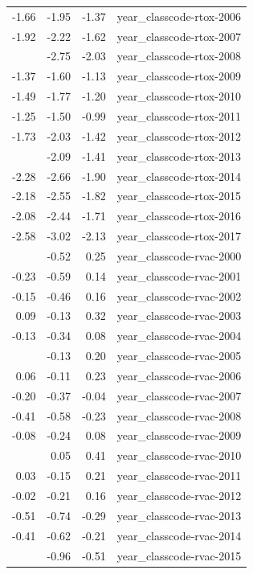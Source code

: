 \documentclass[]{article}
\begin{document}
\begin{longtable}[t]{rrrl}
-1.66 & -1.95 & -1.37 & year\_classcode-rtox-2006\\
-1.92 & -2.22 & -1.62 & year\_classcode-rtox-2007\\
\addlinespace
-2.39 & -2.75 & -2.03 & year\_classcode-rtox-2008\\
-1.37 & -1.60 & -1.13 & year\_classcode-rtox-2009\\
-1.49 & -1.77 & -1.20 & year\_classcode-rtox-2010\\
-1.25 & -1.50 & -0.99 & year\_classcode-rtox-2011\\
-1.73 & -2.03 & -1.42 & year\_classcode-rtox-2012\\
\addlinespace
-1.75 & -2.09 & -1.41 & year\_classcode-rtox-2013\\
-2.28 & -2.66 & -1.90 & year\_classcode-rtox-2014\\
-2.18 & -2.55 & -1.82 & year\_classcode-rtox-2015\\
-2.08 & -2.44 & -1.71 & year\_classcode-rtox-2016\\
-2.58 & -3.02 & -2.13 & year\_classcode-rtox-2017\\
\addlinespace
-0.14 & -0.52 & 0.25 & year\_classcode-rvac-2000\\
-0.23 & -0.59 & 0.14 & year\_classcode-rvac-2001\\
-0.15 & -0.46 & 0.16 & year\_classcode-rvac-2002\\
0.09 & -0.13 & 0.32 & year\_classcode-rvac-2003\\
-0.13 & -0.34 & 0.08 & year\_classcode-rvac-2004\\
\addlinespace
0.03 & -0.13 & 0.20 & year\_classcode-rvac-2005\\
0.06 & -0.11 & 0.23 & year\_classcode-rvac-2006\\
-0.20 & -0.37 & -0.04 & year\_classcode-rvac-2007\\
-0.41 & -0.58 & -0.23 & year\_classcode-rvac-2008\\
-0.08 & -0.24 & 0.08 & year\_classcode-rvac-2009\\
\addlinespace
0.23 & 0.05 & 0.41 & year\_classcode-rvac-2010\\
0.03 & -0.15 & 0.21 & year\_classcode-rvac-2011\\
-0.02 & -0.21 & 0.16 & year\_classcode-rvac-2012\\
-0.51 & -0.74 & -0.29 & year\_classcode-rvac-2013\\
-0.41 & -0.62 & -0.21 & year\_classcode-rvac-2014\\
\addlinespace
-0.73 & -0.96 & -0.51 & year\_classcode-rvac-2015\\

\end{longtable}
\end{document}
